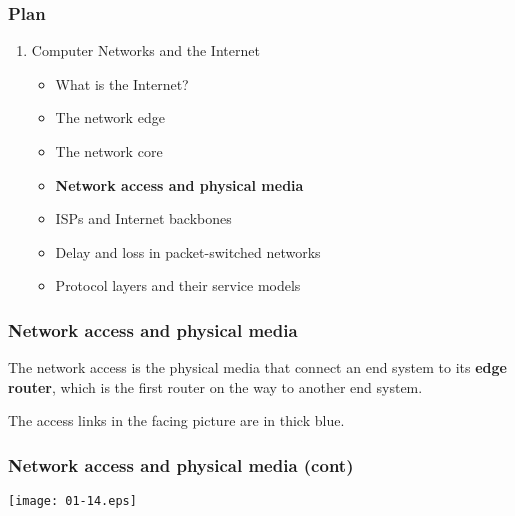 
%
\begin{frame}
\frametitle{Plan}

\begin{enumerate}

  \item Computer Networks and the Internet

    \begin{itemize}

      \item What is the Internet?

      \item The network edge

      \item The network core

      \item \textbf{Network access and physical media}

      \item ISPs and Internet backbones

      \item Delay and loss in packet-switched networks
 
      \item Protocol layers and their service models

    \end{itemize}

\end{enumerate}

\end{frame}

%
\begin{frame}
\frametitle{Network access and physical media}

The network access is the physical media that connect an end system to
its \textbf{edge router}, which is the first router on the way to
another end system.

\bigskip

The access links in the facing picture are in thick blue.

\end{frame}

%
\begin{frame}
\frametitle{Network access and physical media (cont)}

\begin{center}
  \texttt{[image: 01-14.eps]}
\end{center}

\end{frame}

